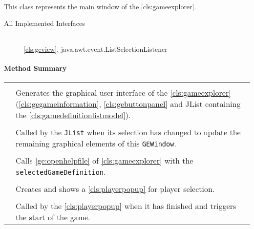 \pagebreak

This class represents the main window of the \ref{cls:gameexplorer}. \\

\begin{description}
	\item[All Implemented Interfaces] \hfill \\
	\ref{cls:geview}, java.awt.event.ListSelectionListener
\end{description}

\centerdash

\paragraph*{Method Summary}
\paragraph*{}
\begin{longtable}{Lp{10cm}}
	\startmethodtable
	 \\
	& Generates the graphical user interface of the \ref{cls:gameexplorer} (\ref{cls:gegameinformation}, \ref{cls:gebuttonpanel} and JList containing the \ref{cls:gamedefinitionlistmodel}). \\
	 \\
	& Called by the \texttt{JList} when its selection has changed to update the remaining graphical elements of this \texttt{GEWindow}. \\
	 \\
	& Calls \ref{ge:openhelpfile} of \ref{cls:gameexplorer} with the \texttt{selectedGameDefinition}. \\
	 \\
	& Creates and shows a \ref{cls:playerpopup} for player selection. \\
	 \\
	& Called by the \ref{cls:playerpopup} when it has finished and triggers the start of the game. \\
	\hline
\end{longtable}


